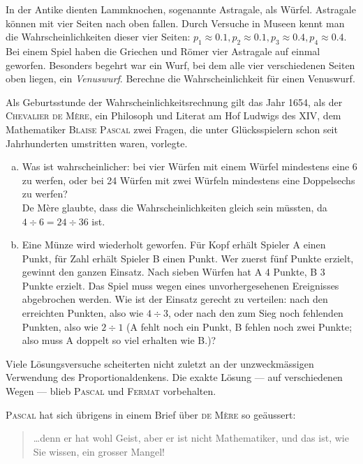 \documentclass[%
11pt,%
twoside,%
titlepage,%
german,%
headsepline%
]{scrartcl}
\begin{document}
\begin{ueb}
 In der Antike dienten Lammknochen, sogenannte Astragale, als Würfel. Astragale können mit vier Seiten nach oben fallen. Durch Versuche in Museen kennt man die Wahrscheinlichkeiten dieser vier Seiten: $p_1\approx0.1, p_2\approx0.1, p_3\approx0.4, p_4\approx0.4$. Bei einem Spiel haben die Griechen und Römer vier Astragale auf einmal geworfen. Besonders begehrt war ein Wurf, bei dem alle vier verschiedenen Seiten oben liegen, ein \emph{Venuswurf}. Berechne die Wahrscheinlichkeit für einen Venuswurf.
 \end{ueb}
 
 \begin{ueb}
Als Geburtsstunde der Wahrscheinlichkeitsrechnung gilt das Jahr 1654, als der \textsc{Chevalier de Mère}, ein Philosoph und Literat am Hof Ludwigs des XIV, dem Mathematiker \textsc{Blaise Pascal} zwei Fragen, die unter Glücksspielern schon seit Jahrhunderten umstritten waren, vorlegte.
\begin{enumerate}[a)]
\item Was ist wahrscheinlicher: bei vier Würfen mit einem Würfel mindestens eine 6 zu werfen, oder bei 24 Würfen mit zwei Würfeln mindestens eine Doppelsechs zu werfen?\\
De Mère glaubte, dass die Wahrscheinlichkeiten gleich sein müssten, da $4\div6 = 24\div36$ ist.
\item Eine Münze wird wiederholt geworfen. Für Kopf erhält Spieler A einen Punkt, für Zahl erhält Spieler B einen Punkt. Wer zuerst fünf Punkte erzielt, gewinnt den ganzen Einsatz. Nach sieben Würfen hat A 4 Punkte, B 3 Punkte erzielt. Das Spiel muss wegen eines unvorhergesehenen Ereignisses abgebrochen werden. Wie ist der Einsatz gerecht zu verteilen: nach den erreichten Punkten, also wie $4\div3$, oder nach den zum Sieg noch fehlenden Punkten, also wie $2\div1$ (A fehlt noch ein Punkt, B fehlen noch zwei Punkte; also muss A doppelt so viel erhalten wie B.)?
\end{enumerate}
\end{ueb}

Viele Lösungsversuche scheiterten nicht zuletzt an der unzweckmässigen Verwendung des Proportionaldenkens. Die exakte Lösung --- auf verschiedenen Wegen --- blieb \textsc{Pascal} und \textsc{Fermat} vorbehalten.

\textsc{Pascal} hat sich übrigens in einem Brief über \textsc{de Mère} so geäussert:
\begin{quote}
\dots denn er hat wohl Geist, aber er ist nicht Mathematiker, und das ist, wie Sie wissen, ein grosser Mangel!
\end{quote}
\end{document}
